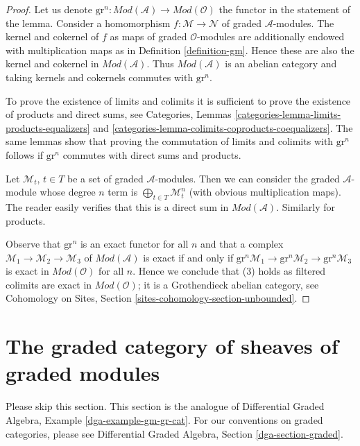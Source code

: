 \begin{proof}
Let us denote
$\text{gr}^n : \textit{Mod}(\mathcal{A}) \to \textit{Mod}(\mathcal{O})$
the functor in the statement of the lemma.
Consider a homomorphism $f : \mathcal{M} \to \mathcal{N}$
of graded $\mathcal{A}$-modules. The kernel
and cokernel of $f$ as maps of graded $\mathcal{O}$-modules
are additionally endowed with multiplication maps as in
Definition \ref{definition-gm}. Hence these are also
the kernel and cokernel in $\textit{Mod}(\mathcal{A})$.
Thus $\textit{Mod}(\mathcal{A})$ is an abelian category
and taking kernels and cokernels commutes with $\text{gr}^n$.

\medskip\noindent
To prove the existence of limits and colimits it is sufficient
to prove the existence of products and direct sums, see
Categories, Lemmas \ref{categories-lemma-limits-products-equalizers} and
\ref{categories-lemma-colimits-coproducts-coequalizers}.
The same lemmas show that
proving the commutation of limits and colimits with $\text{gr}^n$
follows if $\text{gr}^n$ commutes with direct sums and products.

\medskip\noindent
Let $\mathcal{M}_t$, $t \in T$ be a set of graded $\mathcal{A}$-modules.
Then we can consider the graded $\mathcal{A}$-module whose degree $n$
term is $\bigoplus_{t \in T} \mathcal{M}_t^n$ (with obvious multiplication
maps). The reader easily verifies that this is a direct sum in
$\textit{Mod}(\mathcal{A})$. Similarly for products.

\medskip\noindent
Observe that $\text{gr}^n$ is an exact functor for all $n$ and that
a complex $\mathcal{M}_1 \to \mathcal{M}_2 \to \mathcal{M}_3$
of $\textit{Mod}(\mathcal{A})$ is exact if and only if
$\text{gr}^n\mathcal{M}_1 \to \text{gr}^n\mathcal{M}_2 \to
\text{gr}^n\mathcal{M}_3$ is exact in $\textit{Mod}(\mathcal{O})$
for all $n$. Hence we conclude that (3) holds as filtered
colimits are exact in $\textit{Mod}(\mathcal{O})$;
it is a Grothendieck abelian category, see
Cohomology on Sites, Section \ref{sites-cohomology-section-unbounded}.
\end{proof}






\section{The graded category of sheaves of graded modules}
\label{section-gm-gr-cat}

\noindent
Please skip this section. This section is the analogue of
Differential Graded Algebra, Example \ref{dga-example-gm-gr-cat}.
For our conventions on graded categories, please see
Differential Graded Algebra, Section \ref{dga-section-graded}.

